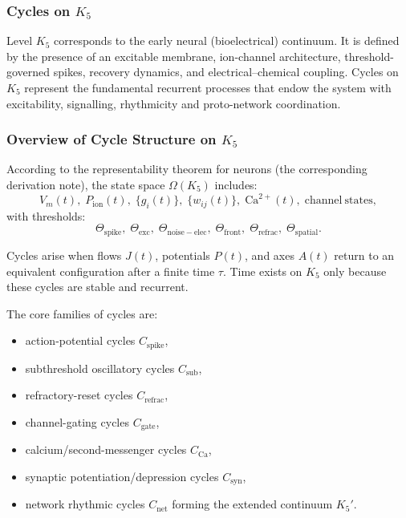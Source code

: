 
\subsubsection{Cycles on \texorpdfstring{$K_5$}{K_5}}
\label{sec:cycles-k5}

Level $K_5$ corresponds to the early neural (bioelectrical) continuum.
It is defined by the presence of an excitable membrane, ion-channel
architecture, threshold-governed spikes, recovery dynamics, and
electrical–chemical coupling.
Cycles on $K_5$ represent the fundamental recurrent processes that endow
the system with excitability, signalling, rhythmicity and proto-network
coordination.

\subsubsection{Overview of Cycle Structure on \texorpdfstring{$K_5$}{K_5}}

According to the representability theorem for neurons (the corresponding derivation note),
the state space $\Omega(K_5)$ includes:
\[
  V_m(t),\;
  P_{\mathrm{ion}}(t),\;
  \{g_i(t)\},\;
  \{w_{ij}(t)\},\;
  \mathrm{Ca}^{2+}(t),\;
  \mathrm{channel\ states},
\]
with thresholds:
\[
  \Theta_{\mathrm{spike}},\;
  \Theta_{\mathrm{exc}},\;
  \Theta_{\mathrm{noise-elec}},\;
  \Theta_{\mathrm{front}},\;
  \Theta_{\mathrm{refrac}},\;
  \Theta_{\mathrm{spatial}}.
\]

Cycles arise when flows $J(t)$, potentials $P(t)$, and axes $A(t)$
return to an equivalent configuration after a finite time $\tau$.
Time exists on $K_5$ only because these cycles are stable and recurrent.

The core families of cycles are:

\begin{itemize}
  \item action-potential cycles $C_{\mathrm{spike}}$,
  \item subthreshold oscillatory cycles $C_{\mathrm{sub}}$,
  \item refractory-reset cycles $C_{\mathrm{refrac}}$,
  \item channel-gating cycles $C_{\mathrm{gate}}$,
  \item calcium/second-messenger cycles $C_{\mathrm{Ca}}$,
  \item synaptic potentiation/depression cycles $C_{\mathrm{syn}}$,
  \item network rhythmic cycles $C_{\mathrm{net}}$ forming the extended continuum $K_5'$.
\end{itemize}

